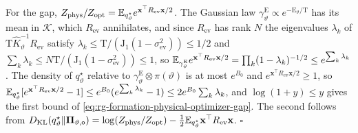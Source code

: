 For the gap, \(Z_{\mathrm{phys}}/Z_{\mathrm{opt}}=
\mathbb E_{q^\star_\vartheta}e^{\mathbf x^\top R_{\mathrm{ev}}\mathbf x/2}\). The
Gaussian law \(\gamma^{\mathrm E}_\vartheta\propto e^{-\mathrm E_\vartheta/\mathrm T}\)
has its mean in \(\mathcal K\), which \(R_{\mathrm{ev}}\) annihilates, and since
\(R_{\mathrm{ev}}\) has rank \(N\) the eigenvalues \(\lambda_k\) of
\(\mathrm T\widehat K_\vartheta^{-1}R_{\mathrm{ev}}\) satisfy
\(\lambda_k\le\mathrm T/(\mathrm J_1(1-\sigma^2_{\mathrm{ev}}))\le1/2\) and
\(\sum_k\lambda_k\le N\mathrm T/(\mathrm J_1(1-\sigma^2_{\mathrm{ev}}))\le1\), so
\(\mathbb E_{\gamma^{\mathrm E}_\vartheta}e^{\mathbf x^\top R_{\mathrm{ev}}\mathbf x/2}
=\prod_k(1-\lambda_k)^{-1/2}\le e^{\sum_k\lambda_k}\). The density of
\(q^\star_\vartheta\) relative to \(\gamma^{\mathrm E}_\vartheta\otimes\pi(\vartheta)\)
is at most \(e^{B_0}\) and \(e^{\mathbf x^\top R_{\mathrm{ev}}\mathbf x/2}\ge1\),
so \(\mathbb E_{q^\star_\vartheta}[e^{\mathbf x^\top R_{\mathrm{ev}}\mathbf x/2}-1]
\le e^{B_0}(e^{\sum_k\lambda_k}-1)\le2e^{B_0}\sum_k\lambda_k\), and
\(\log(1+y)\le y\) gives the first bound of
\cref{eq:rg-formation-physical-optimizer-gap}. The second follows from
\(D_{\mathrm{KL}}(q^\star_\vartheta\Vert\boldsymbol\Pi_{\vartheta,\mathsf o})
=\log(Z_{\mathrm{phys}}/Z_{\mathrm{opt}})
-\tfrac12\mathbb E_{q^\star_\vartheta}\mathbf x^\top R_{\mathrm{ev}}\mathbf x\).
\(\square\)

